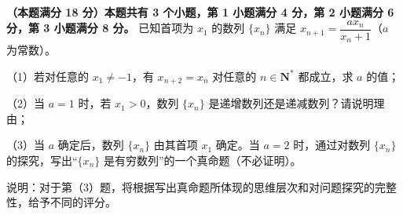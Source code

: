 \begin{question}
\textbf{（本题满分 18 分）本题共有 3 个小题，第 1 小题满分 4 分，第 2 小题满分 6 分，第 3 小题满分 8 分。} 已知首项为 $x_1$ 的数列 $\{x_n\}$ 满足 $x_{n+1}=\dfrac{ax_n}{x_n+1}$（$a$ 为常数）。

（1）若对任意的 $x_1\neq-1$，有 $x_{n+2}=x_n$ 对任意的 $n\in\mathbf N^*$ 都成立，求 $a$ 的值；

（2）当 $a=1$ 时，若 $x_1>0$，数列 $\{x_n\}$ 是递增数列还是递减数列？请说明理由；

（3）当 $a$ 确定后，数列 $\{x_n\}$ 由其首项 $x_1$ 确定。当 $a=2$ 时，通过对数列 $\{x_n\}$ 的探究，写出“$\{x_n\}$ 是有穷数列”的一个真命题（不必证明）。

说明：对于第（3）题，将根据写出真命题所体现的思维层次和对问题探究的完整性，给予不同的评分。

\end{question}